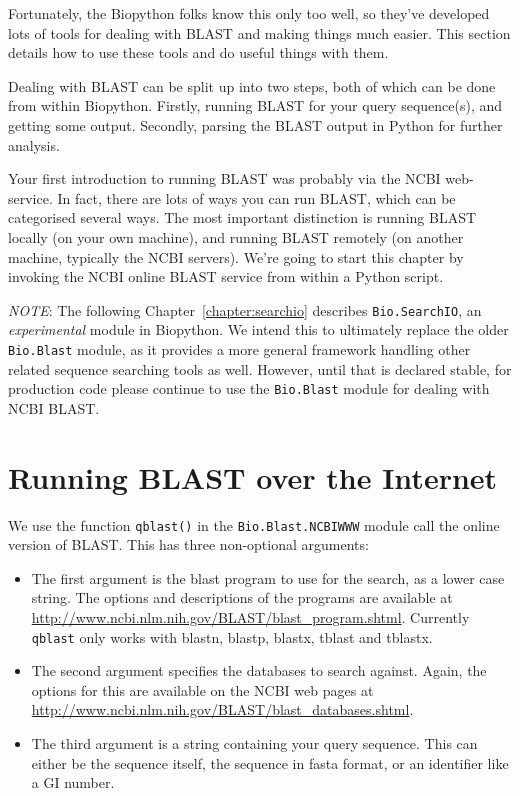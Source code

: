 \documentclass{report}
\begin{document}
Fortunately, the Biopython folks know this only too well, so they've developed lots of tools for dealing with BLAST and making things much easier. This section details how to use these tools and do useful things with them.

Dealing with BLAST can be split up into two steps, both of which can be done from within Biopython.
Firstly, running BLAST for your query sequence(s), and getting some output.
Secondly, parsing the BLAST output in Python for further analysis.

Your first introduction to running BLAST was probably via the NCBI web-service.
In fact, there are lots of ways you can run BLAST, which can be categorised several ways.
The most important distinction is running BLAST locally (on your own machine),
and running BLAST remotely (on another machine, typically the NCBI servers).
We're going to start this chapter by invoking the NCBI online BLAST service
from within a Python script.

\emph{NOTE}: The following Chapter~\ref{chapter:searchio} describes
\verb|Bio.SearchIO|, an \emph{experimental} module in Biopython. We
intend this to ultimately replace the older \verb|Bio.Blast| module, as it
provides a more general framework handling other related sequence
searching tools as well. However, until that is declared stable, for
production code please continue to use the  \verb|Bio.Blast| module
for dealing with NCBI BLAST.

\section{Running BLAST over the Internet}
\label{sec:running-www-blast}

We use the function \verb|qblast()| in the \verb|Bio.Blast.NCBIWWW| module
call the online version of BLAST.  This has three non-optional arguments:
\begin{itemize}
\item The first argument is the blast program to use for the search, as a
lower case string. The options and descriptions of the programs are
available at \url{http://www.ncbi.nlm.nih.gov/BLAST/blast_program.shtml}.
Currently \verb|qblast| only works with blastn, blastp, blastx, tblast
and tblastx.
\item The second argument specifies the databases to search against. Again,
the options for this are available on the NCBI web pages at
\url{http://www.ncbi.nlm.nih.gov/BLAST/blast_databases.shtml}.
\item The third argument is a string containing your query sequence.  This
can either be the sequence itself, the sequence in fasta format,
or an identifier like a GI number.
\end{itemize}
\end{document}
